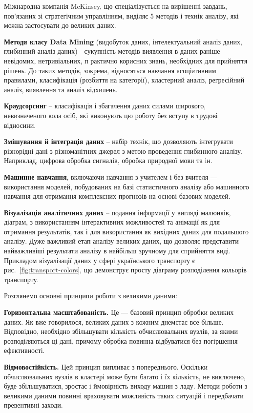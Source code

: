 Міжнародна компанія McKinsey,
що спеціалізується на вирішенні завдань,
пов'язаних зі стратегічним управлінням,
виділяє 5 методів і технік аналізу,
які можна застосувати до великих даних.

\textbf{Методи класу Data Mining} (видобуток даних, інтелектуальний аналіз даних, глибинний аналіз даних) -
сукупність методів виявлення в даних раніше невідомих, нетривіальних, п
рактично корисних знань, необхідних для прийняття рішень.
До таких методів, зокрема, відносяться навчання асоціативним правилами,
класифікація (розбиття на категорії), кластерний аналіз, регресійний аналіз,
виявлення та аналіз відхилень.

\textbf{Краудсорсинг} – класифікація і збагачення даних силами широкого,
невизначеного кола осіб,
які виконують цю роботу без вступу в трудові відносини.

\textbf{Змішування й інтеграція даних} – набір технік, що дозволяють інтегрувати різнорідні дані з
різноманітних джерел з метою проведення глибинного аналізу.
Наприклад, цифрова обробка сигналів, обробка природної мови та ін.

\textbf{Машинне навчання}, включаючи навчання з учителем і без вчителя —
використання моделей, побудованих на базі статистичного аналізу або машинного навчання для
отримання комплексних прогнозів на основі базових моделей.

\textbf{Візуалізація аналітичних даних} – подання інформації у вигляді малюнків, діаграм,
з використанням інтерактивних можливостей та анімації як для отримання результатів,
так і для використання як вихідних даних для подальшого аналізу.
Дуже важливий етап аналізу великих даних,
що дозволяє представити найважливіші результати аналізу в найбільш зручному для сприйняття виді.
Прикладом візуалізації даних у сфері українського транспорту є рис.~\ref{fig:transport-colors},
що демонструє просту діаграму розподілення кольорів транспорту.

Розглянемо основні принципи роботи з великими даними:

\textbf{Горизонтальна масштабованість.} Це — базовий принцип обробки великих даних.
Як вже говорилося, великих даних з кожним днем ​​стає все більше.
Відповідно, необхідно збільшувати кількість обчислювальних вузлів,
за якими розподіляються ці дані,
причому обробка повинна відбуватися без погіршення ефективності.

\textbf{Відмовостійкість.} Цей принцип випливає з попереднього.
Оскільки обчислювальних вузлів в кластері може бути багато і їх кількість,
не виключено, буде збільшуватися, зростає і ймовірність виходу машин з ладу.
Методи роботи з великими даними повинні враховувати можливість
таких ситуацій і передбачати превентивні заходи.

